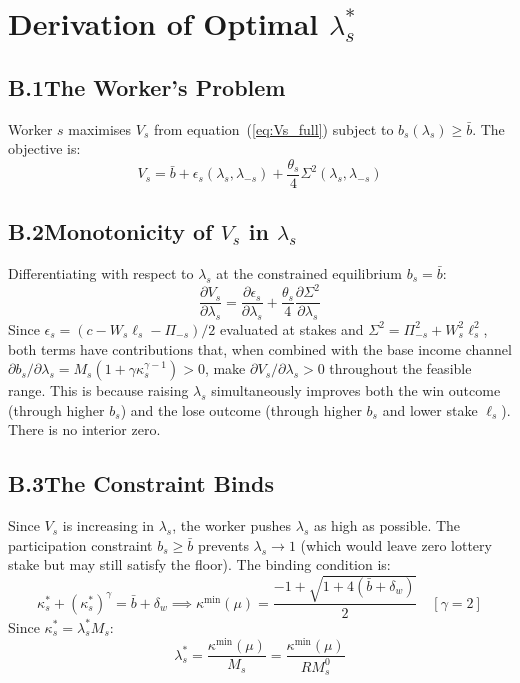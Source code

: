 \documentclass[12pt,a4paper]{article}
\begin{document}
\appendix
\section{Derivation of Optimal $\lambda_s^*$}
\label{app:foc}

\subsection*{B.1\quad The Worker's Problem}

Worker $s$ maximises $V_s$ from equation~(\ref{eq:Vs_full}) subject to
$b_s(\lambda_s) \geq \bar{b}$. The objective is:
\begin{equation}
  V_s = \bar{b} + \epsilon_s(\lambda_s,\lambda_{-s})
      + \frac{\theta_s}{4}\Sigma^2(\lambda_s,\lambda_{-s})
  \tag{B.1}
\end{equation}

\subsection*{B.2\quad Monotonicity of $V_s$ in $\lambda_s$}

Differentiating with respect to $\lambda_s$ at the constrained
equilibrium $b_s = \bar{b}$:
\begin{equation}
  \frac{\partial V_s}{\partial\lambda_s}
  = \frac{\partial\epsilon_s}{\partial\lambda_s}
  + \frac{\theta_s}{4}\frac{\partial\Sigma^2}{\partial\lambda_s}
  \tag{B.2}
\end{equation}
Since $\epsilon_s = (c - W_s\ell_s - \Pi_{-s})/2$ evaluated at stakes
and $\Sigma^2 = \Pi_{-s}^2 + W_s^2\ell_s^2$, both terms have
contributions that, when combined with the base income channel
$\partial b_s/\partial\lambda_s = M_s(1+\gamma\kappa_s^{\gamma-1}) > 0$,
make $\partial V_s/\partial\lambda_s > 0$ throughout the feasible
range. This is because raising $\lambda_s$ simultaneously improves
both the win outcome (through higher $b_s$) and the lose outcome
(through higher $b_s$ and lower stake $\ell_s$). There is no interior
zero.

\subsection*{B.3\quad The Constraint Binds}

Since $V_s$ is increasing in $\lambda_s$, the worker pushes $\lambda_s$
as high as possible. The participation constraint $b_s \geq \bar{b}$
prevents $\lambda_s \to 1$ (which would leave zero lottery stake but
may still satisfy the floor). The binding condition is:
\begin{equation}
  \kappa_s^* + (\kappa_s^*)^\gamma = \bar{b} + \delta_w
  \implies
  \kappa^{\min}(\mu) = \frac{-1+\sqrt{1+4(\bar{b}+\delta_w)}}{2}
  \quad [\gamma=2]
  \tag{B.3}
\end{equation}
Since $\kappa_s^* = \lambda_s^* M_s$:
\begin{equation}
  \lambda_s^* = \frac{\kappa^{\min}(\mu)}{M_s}
  = \frac{\kappa^{\min}(\mu)}{RM_s^0}
  \tag{B.4}
\end{equation}
\end{document}
